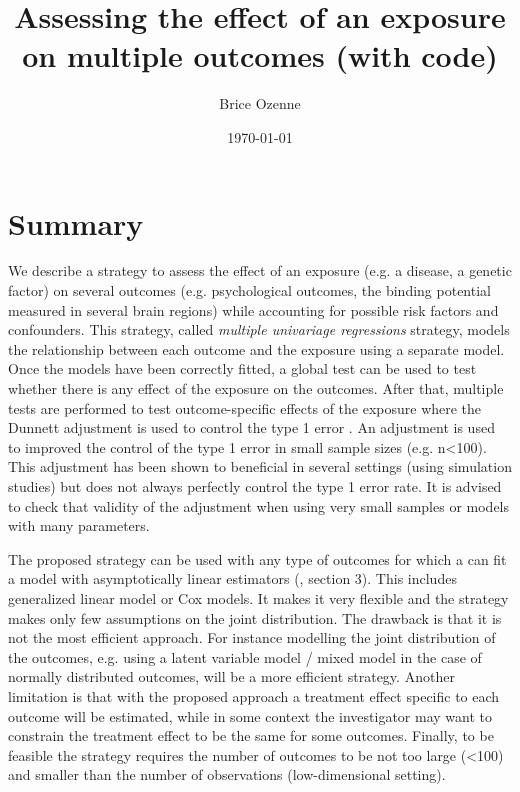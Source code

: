 \documentclass[12pt]{article}
\author{Brice Ozenne}
\date{\today}
\title{Assessing the effect of an exposure on multiple outcomes (with \Rlogo{} code)}
\begin{document}
\maketitle

\section*{Summary}
\label{sec:org9e7a178}
We describe a strategy to assess the effect of an exposure (e.g. a
disease, a genetic factor) on several outcomes (e.g. psychological
outcomes, the binding potential measured in several brain regions)
while accounting for possible risk factors and confounders. This
strategy, called \emph{multiple univariage regressions} strategy, models
the relationship between each outcome and the exposure using a
separate model. Once the models have been correctly fitted, a global
test can be used to test whether there is any effect of the exposure
on the outcomes. After that, multiple tests are performed to test
outcome-specific effects of the exposure where the Dunnett adjustment
is used to control the type 1 error \citep{pipper2012versatile}. An
adjustment is used to improved the control of the type 1 error in
small sample sizes (e.g. n<100). This adjustment has been shown to
beneficial in several settings (using simulation studies) but does not
always perfectly control the type 1 error rate. It is advised to check
that validity of the adjustment when using very small samples or
models with many parameters.

\bigskip

The proposed strategy can be used with any type of outcomes for which
  a can fit a model with asymptotically linear estimators
  (\cite{tsiatis2007semiparametric}, section 3). This includes
  generalized linear model or Cox models. It makes it very flexible
  and the strategy makes only few assumptions on the joint
  distribution. The drawback is that it is not the most efficient
  approach. For instance modelling the joint distribution of the
  outcomes, e.g. using a latent variable model / mixed model in the
  case of normally distributed outcomes, will be a more efficient
  strategy. Another limitation is that with the proposed approach a
  treatment effect specific to each outcome will be estimated, while
  in some context the investigator may want to constrain the treatment
  effect to be the same for some outcomes. Finally, to be feasible the
  strategy requires the number of outcomes to be not too large (<100)
  and smaller than the number of observations (low-dimensional
  setting).
\end{document}
